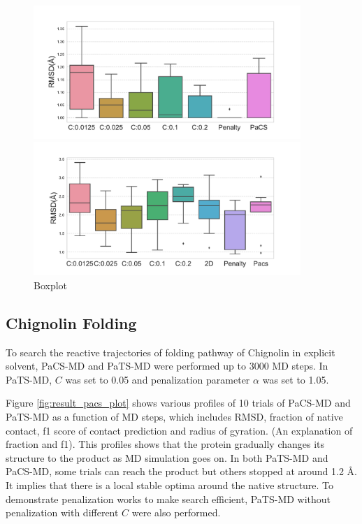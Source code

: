 \begin{figure}[ht]
\begin{minipage}[b]{0.95\textwidth}
\centering
\includegraphics[width=0.9\textwidth]{Figures/chignolin_result_boxplot.pdf}
\end{minipage}
\begin{minipage}[b]{0.95\textwidth}
\centering
\includegraphics[width=0.9\textwidth]{Figures/trpcage_result_boxplot.pdf}
\end{minipage}
\caption{Boxplot}
\label{fig:result_box}
\end{figure}


\subsection{Chignolin Folding}
To search the reactive trajectories of folding pathway of Chignolin in explicit solvent, PaCS-MD and PaTS-MD were performed up to 3000 MD steps. In PaTS-MD, $C$ was set to 0.05 and penalization parameter $\alpha$ was set to 1.05. 

Figure \ref{fig:result_pacs_plot} shows various profiles of 10 trials of PaCS-MD and PaTS-MD as a function of MD steps, which includes RMSD, fraction of native contact, f1 score of contact prediction and radius of gyration. (An explanation of fraction and f1). 
This profiles shows that the protein gradually changes its structure to the product as MD simulation goes on.
In both PaTS-MD and PaCS-MD, some trials can reach the product but others stopped at around 1.2 \AA. It implies that there is a local stable optima around the native structure.
To demonstrate penalization works to make search efficient, PaTS-MD without penalization with different $C$ were also performed.

